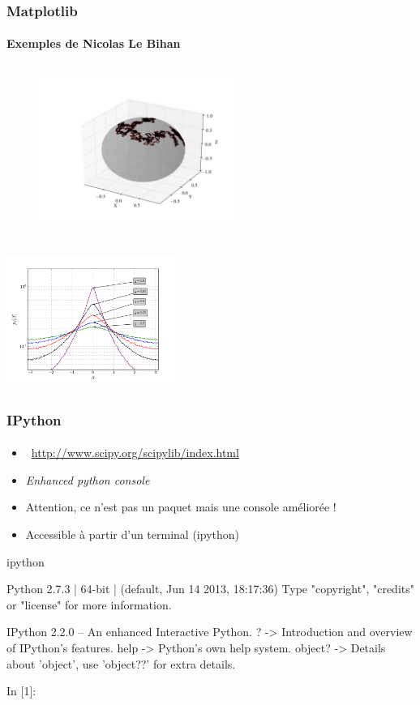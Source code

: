 \begin{frame}
\frametitle{Matplotlib}
\framesubtitle{Exemples de Nicolas Le Bihan}
\begin{minipage}{0.4\linewidth}
\begin{figure}
\includegraphics[width=6.5cm,height=5.5cm]{fig/BrownSphere.png}
\end{figure}
\end{minipage}
\hspace{1cm}
\begin{minipage}{0.4\linewidth}
\includegraphics[width=5.5cm,height=4.5cm]{fig/Distrib.png}
\end{minipage}
\end{frame}
\begin{frame}[fragile]
\frametitle{IPython}
\framesubtitle{}
\begin{itemize}
 \item {} \, \url{http://www.scipy.org/scipylib/index.html}
 \item \emph{Enhanced python console}
 \item Attention, ce n'est pas un paquet mais une console améliorée !
 \item Accessible à partir d'un terminal (ipython) 
\end{itemize}

\begin{shell}
ipython 
\end{shell}

\begin{pythonConsole}
Python 2.7.3 | 64-bit | (default, Jun 14 2013, 18:17:36) 
Type "copyright", "credits" or "license" for more information.

IPython 2.2.0 -- An enhanced Interactive Python.
?         -> Introduction and overview of IPython's features.
help      -> Python's own help system.
object?   -> Details about 'object', use 'object??' for extra details.

In [1]: 
\end{pythonConsole}
\end{frame}
